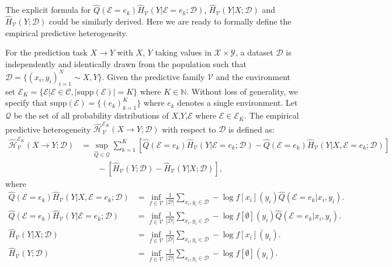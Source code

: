 The explicit formula for $\hat Q(\mathcal E=e_k)\hat H_{\mathcal V}(Y|\mathcal E=e_k;\mathcal D)$, $\hat H_{\mathcal V}(Y|X;\mathcal D)$ and $\hat H_{\mathcal V}(Y;\mathcal D)$ could be similarly derived. Here we are ready to formally define the empirical predictive heterogeneity.

\begin{definition} 
\label{def:empirical_predictive_heterogeneity}
	For the prediction task $X\rightarrow Y$ with $X$, $Y$ taking values in $\mathcal X \times \mathcal Y$, a dataset $\mathcal D$ is independently and identically drawn from the population such that $\mathcal D=\{(x_i,y_i)_{i=1}^N \sim X,Y \}$. 
	Given the predictive family $\mathcal V$ and the environment set $\mathscr E_K =\{ \mathcal E|\mathcal E \in \mathcal C, |\text{supp}(\mathcal E)|=K \}$ where $K \in \mathbb N$.
	Without loss of generality, we specify that  $\text{supp}(\mathcal E) = \{ (e_k)_{k=1}^K \}$ where $e_k$ denotes a single environment.
	Let $\mathcal Q$ be the set of all probability distributions of $X$,$Y$,$\mathcal E$ where $\mathcal E \in \mathscr E_K$. The empirical predictive heterogeneity $\hat{\mathcal{H}}^{\mathscr{E}_K}_{\mathcal V}(X\rightarrow Y; \mathcal D)$ with respect to $\mathcal D$  is defined as:
	\begin{equation}
	\label{equ:appendix-formal-empirical}
	    \begin{aligned}
    \hat{\mathcal H}_{\mathcal V}^{\mathscr E_K}(X \rightarrow Y; \mathcal D) 
    &= \sup_{\hat Q \in \mathcal Q } {\sum_{k=1}^K \left[\hat Q(\mathcal E=e_k)\hat H_{\mathcal V}(Y|\mathcal E=e_k;\mathcal D) - \hat Q(\mathcal E=e_k)\hat H_{\mathcal V}(Y|X, \mathcal E=e_k;\mathcal D)\right]} \\
    & \quad\quad - [\hat H_{\mathcal V}(Y;\mathcal D) - \hat H_{\mathcal V}(Y|X;\mathcal D)],
\end{aligned}
	\end{equation}
where
\begin{align}
    \hat Q(\mathcal E=e_k)\hat H_{\mathcal V}(Y|X, \mathcal E=e_k;\mathcal D) &=
    \inf_{f \in \mathcal V} \frac{1}{|\mathcal D|}  \sum_{x_i,y_i \in \mathcal D} -\log f[x_i](y_i) \hat Q(\mathcal E=e_k|x_i,y_i). \\
    \hat Q(\mathcal E=e_k)\hat H_{\mathcal V}(Y|\mathcal E=e_k;\mathcal D) &= \inf_{f \in \mathcal V} \frac{1}{|\mathcal D|}  \sum_{x_i,y_i \in \mathcal D} -\log f[\emptyset](y_i) \hat Q(\mathcal E=e_k|x_i,y_i). \\
    \hat H_{\mathcal V}(Y|X;\mathcal D) &=\inf_{f \in \mathcal V} \frac{1}{|\mathcal D|}  \sum_{x_i,y_i \in \mathcal D} -\log  f[x_i](y_i). \\
    \hat H_{\mathcal V}(Y;\mathcal D) &=\inf_{f \in \mathcal V} \frac{1}{|\mathcal D|}  \sum_{x_i,y_i \in \mathcal D} -\log  f[\emptyset](y_i).
\end{align}
\end{definition}

